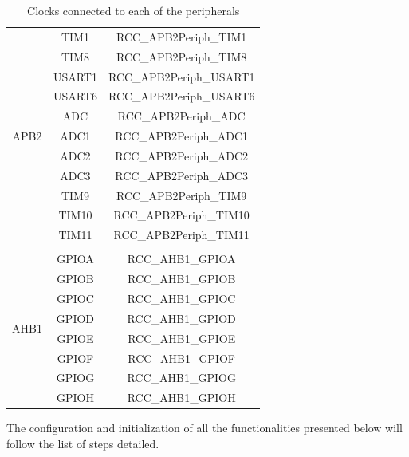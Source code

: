 \documentclass[11pt,a4paper]{report}
\begin{document}
\begin{table}[H]
{\begin{tabular}{ccc}
\multicolumn{1}{|c|}{\multirow{11}{*}{APB2}} & \multicolumn{1}{c|}{TIM1} & \multicolumn{1}{c|}{RCC\_APB2Periph\_TIM1} \\ \cline{2-3} 
\multicolumn{1}{|c|}{} & \multicolumn{1}{c|}{TIM8} & \multicolumn{1}{c|}{RCC\_APB2Periph\_TIM8} \\ \cline{2-3} 
\multicolumn{1}{|c|}{} & \multicolumn{1}{c|}{USART1} & \multicolumn{1}{c|}{RCC\_APB2Periph\_USART1} \\ \cline{2-3} 
\multicolumn{1}{|c|}{} & \multicolumn{1}{c|}{USART6} & \multicolumn{1}{c|}{RCC\_APB2Periph\_USART6} \\ \cline{2-3} 
\multicolumn{1}{|c|}{} & \multicolumn{1}{c|}{ADC} & \multicolumn{1}{c|}{RCC\_APB2Periph\_ADC} \\ \cline{2-3} 
\multicolumn{1}{|c|}{} & \multicolumn{1}{c|}{ADC1} & \multicolumn{1}{c|}{RCC\_APB2Periph\_ADC1} \\ \cline{2-3} 
\multicolumn{1}{|c|}{} & \multicolumn{1}{c|}{ADC2} & \multicolumn{1}{c|}{RCC\_APB2Periph\_ADC2} \\ \cline{2-3} 
\multicolumn{1}{|c|}{} & \multicolumn{1}{c|}{ADC3} & \multicolumn{1}{c|}{RCC\_APB2Periph\_ADC3} \\ \cline{2-3} 
\multicolumn{1}{|c|}{} & \multicolumn{1}{c|}{TIM9} & \multicolumn{1}{c|}{RCC\_APB2Periph\_TIM9} \\ \cline{2-3} 
\multicolumn{1}{|c|}{} & \multicolumn{1}{c|}{TIM10} & \multicolumn{1}{c|}{RCC\_APB2Periph\_TIM10} \\ \cline{2-3} 
\multicolumn{1}{|c|}{} & \multicolumn{1}{c|}{TIM11} & \multicolumn{1}{c|}{RCC\_APB2Periph\_TIM11} \\ \hline
\multicolumn{1}{l}{} & \multicolumn{1}{l}{} & \multicolumn{1}{l}{} \\ \hline
\multicolumn{1}{|c|}{\multirow{8}{*}{AHB1}} & \multicolumn{1}{c|}{GPIOA} & \multicolumn{1}{c|}{RCC\_AHB1\_GPIOA} \\ \cline{2-3} 
\multicolumn{1}{|c|}{} & \multicolumn{1}{c|}{GPIOB} & \multicolumn{1}{c|}{RCC\_AHB1\_GPIOB} \\ \cline{2-3} 
\multicolumn{1}{|c|}{} & \multicolumn{1}{c|}{GPIOC} & \multicolumn{1}{c|}{RCC\_AHB1\_GPIOC} \\ \cline{2-3} 
\multicolumn{1}{|c|}{} & \multicolumn{1}{c|}{GPIOD} & \multicolumn{1}{c|}{RCC\_AHB1\_GPIOD} \\ \cline{2-3} 
\multicolumn{1}{|c|}{} & \multicolumn{1}{c|}{GPIOE} & \multicolumn{1}{c|}{RCC\_AHB1\_GPIOE} \\ \cline{2-3} 
\multicolumn{1}{|c|}{} & \multicolumn{1}{c|}{GPIOF} & \multicolumn{1}{c|}{RCC\_AHB1\_GPIOF} \\ \cline{2-3} 
\multicolumn{1}{|c|}{} & \multicolumn{1}{c|}{GPIOG} & \multicolumn{1}{c|}{RCC\_AHB1\_GPIOG} \\ \cline{2-3} 
\multicolumn{1}{|c|}{} & \multicolumn{1}{c|}{GPIOH} & \multicolumn{1}{c|}{RCC\_AHB1\_GPIOH} \\ \hline
\end{tabular}
}
\caption{Clocks connected to each of the peripherals}
\label{clock_periph}
\end{table}
The configuration and initialization of all the functionalities presented below will follow the list of steps detailed. 
\end{document}
